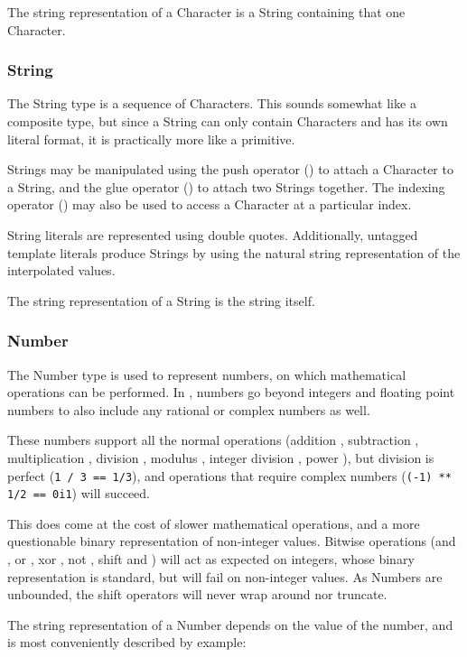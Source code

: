 The string representation of a Character is a String containing that one
Character.

\subsubsection{String}

The String type is a sequence of Characters. This sounds somewhat like
a composite type, but since a String can only contain Characters and has
its own literal format, it is practically more like a primitive.

Strings may be manipulated using the push operator (\op{+}) to attach a
Character to a String, and the glue operator (\op{<>}) to attach two
Strings together. The indexing operator () may also be used to
access a Character at a particular index.

String literals are represented using double quotes. Additionally,
untagged template literals produce Strings by using the natural
string representation of the interpolated values.

The string representation of a String is the string itself.

\subsubsection{Number}

The Number type is used to represent numbers, on which mathematical
operations can be performed. In \Trilogy{}, numbers go beyond integers
and floating point numbers to also include any rational or complex
numbers as well.

These numbers support all the normal operations (addition \op{+},
subtraction \op{-}, multiplication \op{*}, division \op{/},
modulus \op{\%}, integer division \op{//}, power \op{**}), but
division is perfect (\texttt{1 / 3 == 1/3}), and operations that
require complex numbers (\texttt{(-1) ** 1/2 == 0i1}) will succeed.

This does come at the cost of slower mathematical operations, and a
more questionable binary representation of non-integer values. Bitwise
operations (and \op{\&}, or \op{|}, xor \op{\textasciicircum}, not
\op{\textasciitilde}, shift \op{\textasciitilde>} and \op{<\textasciitilde})
will act as expected on integers, whose binary representation is
standard, but will fail on non-integer values. As Numbers are unbounded,
the shift operators will never wrap around nor truncate.

The string representation of a Number depends on the value of the number,
and is most conveniently described by example:

